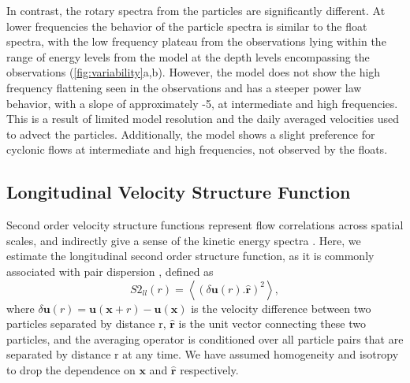 \documentclass[]{ametsoc}
\begin{document}
In contrast, the rotary spectra from the particles are significantly different. At lower frequencies the behavior of the particle spectra is similar to the float spectra, with the low frequency plateau from the observations lying within the range of energy levels from the model at the depth levels encompassing the observations (\ref{fig:variability}a,b). However, the model does not show the high frequency flattening seen in the observations and has a steeper power law behavior, with a slope of approximately -5, at intermediate and high frequencies. This is a result of limited model resolution and the daily averaged velocities used to advect the particles. Additionally, the model shows a slight preference for cyclonic flows at intermediate and high frequencies, not observed by the floats. 

\subsection{Longitudinal Velocity Structure Function}
Second order velocity structure functions represent flow correlations across spatial scales, and indirectly give a sense of the kinetic energy spectra \citep{babiano1985structure, lacasce2016estimating}. Here, we estimate the longitudinal second order structure function, as it is commonly associated with pair dispersion \citep{babiano1990relative}, defined as 
\begin{equation}
    S2_{ll}(r) = \left< (\delta \mathbf{u}(r). \mathbf{\hat{r}})^2\right>,
\end{equation}
where $\delta \mathbf{u} (r) = \mathbf{u}(\mathbf{x} + r) - \mathbf{u}(\mathbf{x})$ is the velocity difference between two particles separated by distance r, $\mathbf{\hat{r}}$ is the unit vector connecting these two particles, and the averaging operator is conditioned over all particle pairs that are separated by distance r at any time. We have assumed homogeneity and isotropy to drop the dependence on $\mathbf{x}$ and $\mathbf{\hat{r}}$ respectively. 
\end{document}

